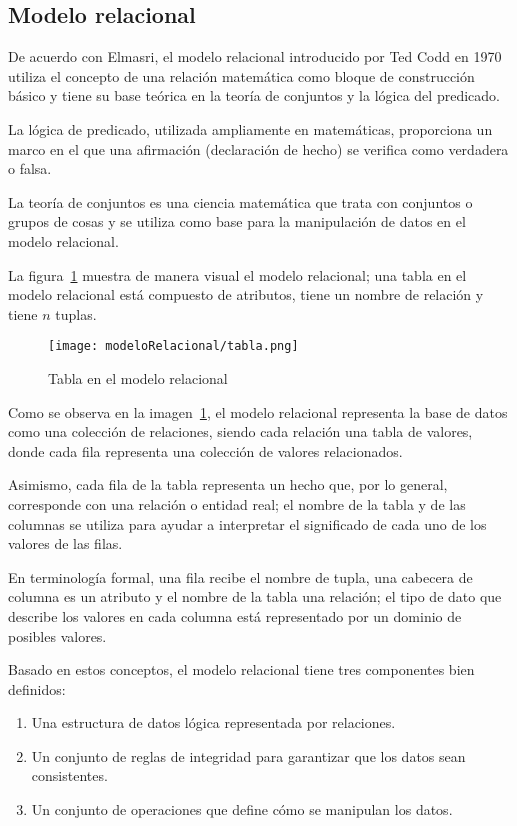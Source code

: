\subsection{Modelo relacional}

De acuerdo con Elmasri\cite{ramez_elmasri_fundamentos_nodate}, el modelo relacional introducido por Ted Codd en 1970\cite{codd_relational_nodate} utiliza el concepto de una relación matemática como bloque de construcción básico y tiene su base teórica en la teoría de conjuntos y la lógica del predicado.

La lógica de predicado, utilizada ampliamente en matemáticas, proporciona un marco en el que una afirmación (declaración de hecho) se verifica como verdadera o falsa.


La teoría de conjuntos es una ciencia matemática que trata con conjuntos o grupos de cosas y se utiliza como base para la manipulación de datos en el modelo relacional.

La figura~\ref{img:modeloRelacional-Tabla} muestra de manera visual el modelo relacional; una tabla en el modelo relacional está compuesto de atributos, tiene un nombre de relación y tiene $n$ tuplas.


\begin{figure}[H]
    \centering
    \texttt{[image: modeloRelacional/tabla.png]}
    \caption{Tabla en el modelo relacional}
    \label{img:modeloRelacional-Tabla}
\end{figure} 
Como se observa en la imagen~\ref{img:modeloRelacional-Tabla}, el modelo relacional representa la base de datos como una colección de relaciones, siendo cada relación una tabla de valores, donde cada fila representa una colección de valores relacionados.


Asimismo, cada fila de la tabla representa un hecho que, por lo general, corresponde con una relación o entidad real; el nombre de la tabla y de las columnas se utiliza para ayudar a interpretar el significado de cada uno de los valores de las filas.


En terminología formal, una fila recibe el nombre de tupla, una cabecera de columna es un atributo y el nombre de la tabla una relación; el tipo de dato que describe los valores en cada columna está representado por un dominio de posibles valores. 


Basado en estos conceptos, el modelo relacional tiene tres componentes bien definidos:
\begin{enumerate}
    \item Una estructura de datos lógica representada por relaciones.
    \item Un conjunto de reglas de integridad para garantizar que los datos sean consistentes.
    \item Un conjunto de operaciones que define cómo se manipulan los datos.
\end{enumerate}
